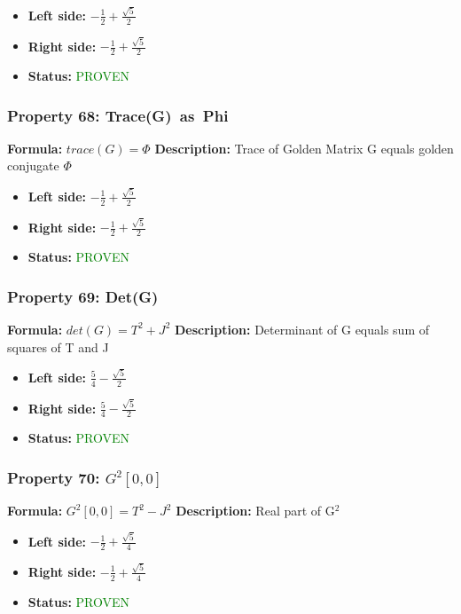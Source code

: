 \begin{itemize}
\item \textbf{Left side:} $- \frac{1}{2} + \frac{\sqrt{5}}{2}$
\item \textbf{Right side:} $- \frac{1}{2} + \frac{\sqrt{5}}{2}$
\item \textbf{Status:} \textcolor{green}{PROVEN}
\end{itemize}

\subsubsection*{Property 68: Trace(G)~as~Phi}
\textbf{Formula:} $trace(G) = \Phi$
\textbf{Description:} Trace of Golden Matrix G equals golden conjugate $\Phi$

\begin{itemize}
\item \textbf{Left side:} $- \frac{1}{2} + \frac{\sqrt{5}}{2}$
\item \textbf{Right side:} $- \frac{1}{2} + \frac{\sqrt{5}}{2}$
\item \textbf{Status:} \textcolor{green}{PROVEN}
\end{itemize}

\subsubsection*{Property 69: Det(G)}
\textbf{Formula:} $det(G) = T^2 + J^2$
\textbf{Description:} Determinant of G equals sum of squares of T and J

\begin{itemize}
\item \textbf{Left side:} $\frac{5}{4} - \frac{\sqrt{5}}{2}$
\item \textbf{Right side:} $\frac{5}{4} - \frac{\sqrt{5}}{2}$
\item \textbf{Status:} \textcolor{green}{PROVEN}
\end{itemize}

\subsubsection*{Property 70: $G^{2}$$[0,0]$}
\textbf{Formula:} $G^2[0,0] = T^2 - J^2$
\textbf{Description:} Real part of G$^2$

\begin{itemize}
\item \textbf{Left side:} $- \frac{1}{2} + \frac{\sqrt{5}}{4}$
\item \textbf{Right side:} $- \frac{1}{2} + \frac{\sqrt{5}}{4}$
\item \textbf{Status:} \textcolor{green}{PROVEN}
\end{itemize}


